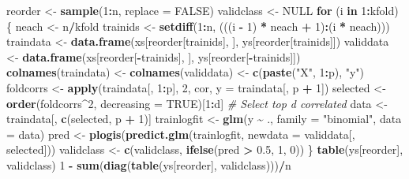 \documentclass[
]{article}
\newenvironment{Shaded}{\begin{snugshade}}{\end{snugshade}}
\newcommand{\AttributeTok}[1]{\textcolor[rgb]{0.13,0.29,0.53}{#1}}
\newcommand{\CommentTok}[1]{\textcolor[rgb]{0.56,0.35,0.01}{\textit{#1}}}
\newcommand{\ConstantTok}[1]{\textcolor[rgb]{0.56,0.35,0.01}{#1}}
\newcommand{\ControlFlowTok}[1]{\textcolor[rgb]{0.13,0.29,0.53}{\textbf{#1}}}
\newcommand{\DecValTok}[1]{\textcolor[rgb]{0.00,0.00,0.81}{#1}}
\newcommand{\FloatTok}[1]{\textcolor[rgb]{0.00,0.00,0.81}{#1}}
\newcommand{\FunctionTok}[1]{\textcolor[rgb]{0.13,0.29,0.53}{\textbf{#1}}}
\newcommand{\NormalTok}[1]{#1}
\newcommand{\OtherTok}[1]{\textcolor[rgb]{0.56,0.35,0.01}{#1}}
\newcommand{\SpecialCharTok}[1]{\textcolor[rgb]{0.81,0.36,0.00}{\textbf{#1}}}
\newcommand{\StringTok}[1]{\textcolor[rgb]{0.31,0.60,0.02}{#1}}
\begin{document}
\begin{Shaded}
\begin{Highlighting}[]
\NormalTok{reorder }\OtherTok{\textless{}{-}} \FunctionTok{sample}\NormalTok{(}\DecValTok{1}\SpecialCharTok{:}\NormalTok{n, }\AttributeTok{replace =} \ConstantTok{FALSE}\NormalTok{)}
\NormalTok{validclass }\OtherTok{\textless{}{-}} \ConstantTok{NULL}
\ControlFlowTok{for}\NormalTok{ (i }\ControlFlowTok{in} \DecValTok{1}\SpecialCharTok{:}\NormalTok{kfold) \{}
\NormalTok{    neach }\OtherTok{\textless{}{-}}\NormalTok{ n}\SpecialCharTok{/}\NormalTok{kfold}
\NormalTok{    trainids }\OtherTok{\textless{}{-}} \FunctionTok{setdiff}\NormalTok{(}\DecValTok{1}\SpecialCharTok{:}\NormalTok{n, (((i }\SpecialCharTok{{-}} \DecValTok{1}\NormalTok{) }\SpecialCharTok{*}\NormalTok{ neach }\SpecialCharTok{+} \DecValTok{1}\NormalTok{)}\SpecialCharTok{:}\NormalTok{(i }\SpecialCharTok{*}\NormalTok{ neach)))}
\NormalTok{    traindata }\OtherTok{\textless{}{-}} \FunctionTok{data.frame}\NormalTok{(xs[reorder[trainids], ], ys[reorder[trainids]])}
\NormalTok{    validdata }\OtherTok{\textless{}{-}} \FunctionTok{data.frame}\NormalTok{(xs[reorder[}\SpecialCharTok{{-}}\NormalTok{trainids], ], ys[reorder[}\SpecialCharTok{{-}}\NormalTok{trainids]])}
    \FunctionTok{colnames}\NormalTok{(traindata) }\OtherTok{\textless{}{-}} \FunctionTok{colnames}\NormalTok{(validdata) }\OtherTok{\textless{}{-}} \FunctionTok{c}\NormalTok{(}\FunctionTok{paste}\NormalTok{(}\StringTok{"X"}\NormalTok{, }\DecValTok{1}\SpecialCharTok{:}\NormalTok{p),}
        \StringTok{"y"}\NormalTok{)}
\NormalTok{    foldcorrs }\OtherTok{\textless{}{-}} \FunctionTok{apply}\NormalTok{(traindata[, }\DecValTok{1}\SpecialCharTok{:}\NormalTok{p], }\DecValTok{2}\NormalTok{, cor, }\AttributeTok{y =}\NormalTok{ traindata[, p }\SpecialCharTok{+}
        \DecValTok{1}\NormalTok{])}
\NormalTok{    selected }\OtherTok{\textless{}{-}} \FunctionTok{order}\NormalTok{(foldcorrs}\SpecialCharTok{\^{}}\DecValTok{2}\NormalTok{, }\AttributeTok{decreasing =} \ConstantTok{TRUE}\NormalTok{)[}\DecValTok{1}\SpecialCharTok{:}\NormalTok{d]  }\CommentTok{\# Select top d correlated }
\NormalTok{    data }\OtherTok{\textless{}{-}}\NormalTok{ traindata[, }\FunctionTok{c}\NormalTok{(selected, p }\SpecialCharTok{+} \DecValTok{1}\NormalTok{)]}
\NormalTok{    trainlogfit }\OtherTok{\textless{}{-}} \FunctionTok{glm}\NormalTok{(y }\SpecialCharTok{\textasciitilde{}}\NormalTok{ ., }\AttributeTok{family =} \StringTok{"binomial"}\NormalTok{, }\AttributeTok{data =}\NormalTok{ data)}
\NormalTok{    pred }\OtherTok{\textless{}{-}} \FunctionTok{plogis}\NormalTok{(}\FunctionTok{predict.glm}\NormalTok{(trainlogfit, }\AttributeTok{newdata =}\NormalTok{ validdata[, selected]))}
\NormalTok{    validclass }\OtherTok{\textless{}{-}} \FunctionTok{c}\NormalTok{(validclass, }\FunctionTok{ifelse}\NormalTok{(pred }\SpecialCharTok{\textgreater{}} \FloatTok{0.5}\NormalTok{, }\DecValTok{1}\NormalTok{, }\DecValTok{0}\NormalTok{))}
\NormalTok{\}}
\FunctionTok{table}\NormalTok{(ys[reorder], validclass)}
\DecValTok{1} \SpecialCharTok{{-}} \FunctionTok{sum}\NormalTok{(}\FunctionTok{diag}\NormalTok{(}\FunctionTok{table}\NormalTok{(ys[reorder], validclass)))}\SpecialCharTok{/}\NormalTok{n}
\end{Highlighting}
\end{Shaded}
\end{document}
